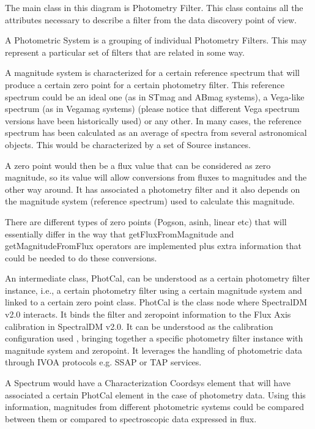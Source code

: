 \documentclass[11pt,a4paper]{ivoa}
\begin{document}
The main class in this diagram is Photometry Filter. This class contains all the attributes necessary to describe a filter from the data discovery point of view.
\par

A Photometric System is a grouping of individual Photometry Filters. This may represent a particular set of filters that are related in some way.
\par

A magnitude system is characterized for a certain reference spectrum that will produce a certain zero point for a certain photometry filter. This reference spectrum could be an ideal one (as in STmag and ABmag systems), a Vega-like spectrum (as in Vegamag systems) (please notice that different Vega spectrum versions have been historically used) or any other. In many cases, the reference spectrum has been calculated as an average of spectra from several astronomical objects. This would be characterized by a set of Source instances.
\par

A zero point would then be a flux value that can be considered as zero magnitude, so its value will allow conversions from fluxes to magnitudes and the other way around. It has associated a photometry filter and it also depends on the magnitude system (reference spectrum) used to calculate this magnitude.
\par

There are different types of zero points (Pogson, asinh, linear etc) that will essentially differ in the way that getFluxFromMagnitude and getMagnitudeFromFlux operators are implemented plus extra information that could be needed to do these conversions.
\par

An intermediate class, PhotCal, can be understood as a certain photometry filter instance, i.e., a certain photometry filter using a certain magnitude system and linked to a certain zero point class. PhotCal is the class node where SpectralDM v2.0 interacts. It binds the filter and zeropoint information to the Flux Axis calibration in SpectralDM v2.0. It can be understood as the calibration configuration used , bringing together a specific photometry filter instance with magnitude system and zeropoint. It leverages the handling of photometric data through IVOA protocols e.g. SSAP or TAP services.
\par

A Spectrum would have a Characterization Coordsys element that will have associated a certain PhotCal element in the case of photometry data. Using this information, magnitudes from different photometric systems could be compared between them or compared to spectroscopic data expressed in flux.
\par
\end{document}
